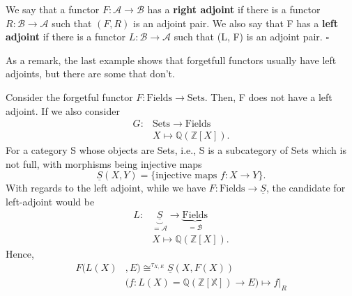 \documentclass[../category_theory.tex]{subfiles}
\begin{document}
\begin{def*}
	We say that a functor \(F:\mathcal{A}\rightarrow \mathcal{B}\) has a \textbf{right adjoint} if there is a functor \(R:\mathcal{B}\rightarrow \mathcal{A}\) such that \((F, R)\) is an adjoint pair. We also say that F has a \textbf{left adjoint} if there is a functor \(L:\mathcal{B}\rightarrow \mathcal{A}\) such that (L, F) is an adjoint pair. \(\square\)
\end{def*}
As a remark, the last example shows that forgetfull functors usually have left adjoints, but there are some that don't.
\begin{example}
	Consider the forgetful functor \(F:\mathrm{Fields}\rightarrow \mathrm{Sets}\). Then, F does not have a left adjoint. If we also consider
	\begin{align*}
		G: & \mathrm{Sets}\rightarrow \mathrm{Fields} \\
		   & X\mapsto \mathbb{Q}(\mathbb{Z}[X]).
	\end{align*}
	For a category S whose objects are Sets, i.e., S is a subcategory of Sets which is not full, with morphisms being injective maps
	\[
		\underline{S}(X, Y)=\{\text{injective maps }f:X\rightarrow Y\}.
	\]
	With regards to the left adjoint, while we have \(F:\mathrm{Fields}\rightarrow \underline{S}\), the candidate for left-adjoint would be
	\begin{align*}
		L: & \underbrace{\underline{S}}_{=\mathcal{A}}\rightarrow \underbrace{\mathrm{Fields}}_{=\mathcal{B}} \\
		   & X\mapsto \mathbb{Q}(\mathbb{Z}[X]).
	\end{align*}
	Hence,
	\begin{align*}
		F(L(X) & , E)\cong^{\tau_{X, E}}\underline{S}(X, F(X))                           \\
		       & \biggl(f:L(X)=\mathbb{Q}(\mathbb{Z[X]})\rightarrow E\biggr)\mapsto f|_R
	\end{align*}
\end{example}
\end{document}
